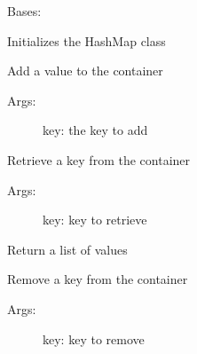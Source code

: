 \documentclass[letterpaper,10pt,english]{sphinxmanual}
\begin{document}
\begin{fulllineitems}
\label{hashMap:ctools.HashMap.HashMap}
Bases: 

Initializes the HashMap class


\begin{fulllineitems}
\label{hashMap:ctools.HashMap.HashMap.add}
Add a value to the container
\begin{description}
\item[{Args:}] \leavevmode
key: the key to add

\end{description}

\end{fulllineitems}



\begin{fulllineitems}
\label{hashMap:ctools.HashMap.HashMap.get}
Retrieve a key from the container
\begin{description}
\item[{Args:}] \leavevmode
key: key to retrieve

\end{description}

\end{fulllineitems}



\begin{fulllineitems}
\label{hashMap:ctools.HashMap.HashMap.itervalues}
Return a list of values

\end{fulllineitems}



\begin{fulllineitems}
\label{hashMap:ctools.HashMap.HashMap.remove}
Remove a key from the container
\begin{description}
\item[{Args:}] \leavevmode
key: key to remove

\end{description}

\end{fulllineitems}


\end{fulllineitems}
\end{document}
